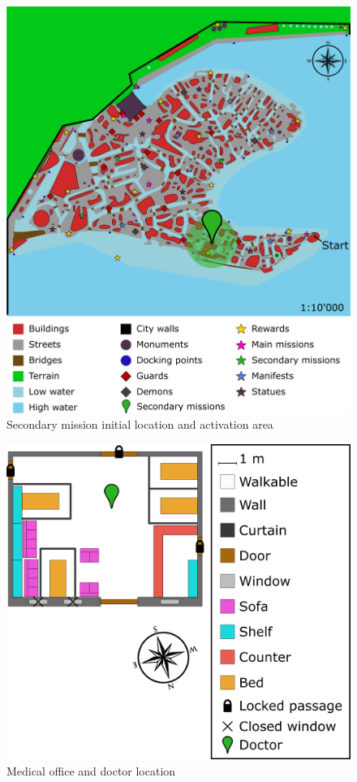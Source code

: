\begin{figure}[H]
  \centering
  \includegraphics[width=\textwidth]{../Images/Maps/dynamiaSecondaryMissions_Doctor}
  \caption{Secondary mission initial location and activation area}
\end{figure}

\begin{figure}[H]
  \centering
  \includegraphics[width=\textwidth]{../Images/Maps/medicalOffice}
  \caption{Medical office and doctor location}
\end{figure}

